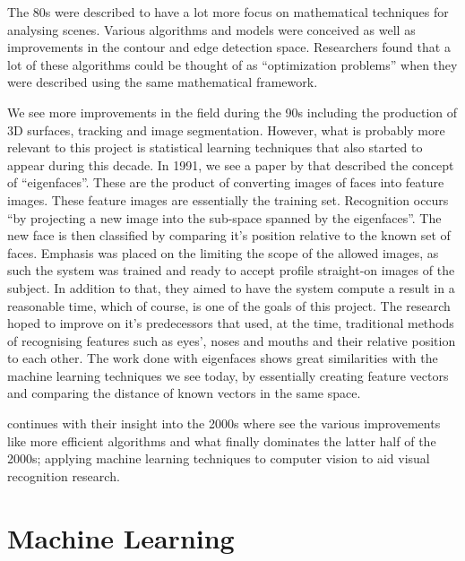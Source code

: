 \documentclass[12pt,a4paper]{report}
\begin{document}
\par

The 80s were described to have a lot more focus on mathematical techniques for analysing scenes. Various algorithms 
and models were conceived as well as improvements in the contour and edge detection space. Researchers found that a 
lot of these algorithms could be thought of as “optimization problems” when they were described using the same 
mathematical framework.

\par

We see more improvements in the field during the 90s including the production of 3D surfaces, tracking and image 
segmentation. However, what is probably more relevant to this project is statistical learning techniques that also 
started to appear during this decade. In 1991, we see a paper by \citet{turk1991face} that described
the concept of “eigenfaces”. These are the product of converting images of faces into feature images. These feature 
images are essentially the training set. Recognition occurs “by projecting a new image into the sub-space spanned by 
the eigenfaces”. The new face is then classified by comparing it's position relative to the known set of faces. 
Emphasis was placed on the limiting the scope of the allowed images, as such the system was trained and ready to 
accept profile straight-on images of the subject. In addition to that, they aimed to have the system compute a result
in a reasonable time, which of course, is one of the goals of this project. The research hoped to improve on it's 
predecessors that used, at the time, traditional methods of recognising features such as eyes', noses and mouths and 
their relative position to each other. The work done with eigenfaces shows great similarities with the machine 
learning techniques we see today, by essentially creating feature vectors and comparing the distance of known 
vectors in the same space.

\par

\citet{SzeliskiRichard2011CV:A} continues with their insight into the 2000s where see the various 
improvements like more efficient algorithms and what finally dominates the latter half of the 2000s; applying machine 
learning techniques to computer vision to aid visual recognition research.

\section{Machine Learning}
\end{document}
